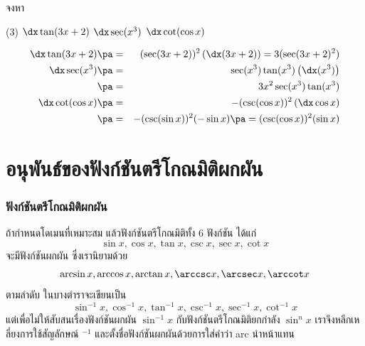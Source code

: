 \begin{frame}[t]
\begin{ex}
จงหา
\begin{tasks}(3)
\task $\dx \tan (3x+2)$
\task $\dx \sec (x^3)$ 
\task $\dx \cot (\cos x)$
\end{tasks}
\end{ex}
\begin{sol}
\begin{eqnarray*}
\dx \tan(3x+2) \pa &=& (\sec (3x+2))^2 \left( \dx (3x+2) \right) = 3(\sec (3x+2)^2) \\
\dx \sec (x^3) \pa &=& \sec (x^3) \tan (x^3) \left( \dx (x^3) \right) \\
\pa &=& 3x^2 \sec (x^3) \tan (x^3) \\
\dx \cot (\cos x) \pa &=& -(\csc (\cos x))^2 \left( \dx \cos x\right) \\
\pa &=& - (\csc (\sin x))^2 (- \sin x) \pa = (\csc (\cos x))^2 (\sin x)
\end{eqnarray*}
\end{sol}
\end{frame}

\section[ตรีโกณมิติผกผัน]{อนุพันธ์ของฟังก์ชันตรีโกณมิติผกผัน}
\frame{\sectionpage}

\begin{frame}
\frametitle{ฟังก์ชันตรีโกณมิติผกผัน}
ถ้ากำหนดโดเมนที่เหมาะสม แล้วฟังก์ชันตรีโกณมิติทั้ง 6 ฟังก์ชัน ได้แก่
\[\sin x, \cos x, \tan x, \csc x, \sec x, \cot x\]
จะมีฟังก์ชันผกผัน ซึ่งเรานิยามด้วย
\[\arcsin x, \arccos x, \arctan x, \arccsc x, \arcsec x, \arccot x\]
ตามลำดับ ในบางตำราจะเขียนเป็น
\[\sin^{-1} x, \cos^{-1} x, \tan^{-1} x, \csc^{-1} x, \sec^{-1} x, \cot^{-1} x\]
แต่เพื่อไม่ให้สับสนเรื่องฟังก์ชันผกผัน $\sin^{-1} x$ กับฟังก์ชันตรีโกณมิติยกกำลัง $\sin^{n} x$ เราจึงหลีกเหลี่ยงการใช้สัญลักษณ์ $^{-1}$ และตั้งชื่อฟังก์ชันผกผันด้วยการใส่คำว่า arc นำหน้าแทน
\end{frame}

